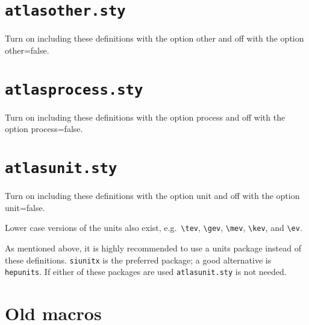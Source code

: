 \documentclass[UKenglish,texlive=2014]{latex/atlasdoc}
\newcommand{\File}[1]{\texttt{#1}\xspace}
\newcommand{\Option}[1]{\textsf{#1}\xspace}
\newcommand{\Package}[1]{\texttt{#1}\xspace}
\begin{document}
{\newpage
\section{\File{atlasother.sty}}

Turn on including these definitions with the option \Option{other} and off with the option \Option{other=false}.




\newpage
\section{\File{atlasprocess.sty}}

Turn on including these definitions with the option \Option{process} and off with the option \Option{process=false}.




\newpage
\section{\File{atlasunit.sty}}

Turn on including these definitions with the option \Option{unit} and off with the option \Option{unit=false}.



\noindent Lower case versions of the units also exist, e.g.\ \verb|\tev|, \verb|\gev|, \verb|\mev|, \verb|\kev|, and
\verb|\ev|. 

As mentioned above, it is highly recommended to use a units package instead of
these definitions. \Package{siunitx} is the preferred package; a good alternative is \Package{hepunits}.
If either of these packages are used \File{atlasunit.sty} is not needed.


\onecolumn
\section{Old macros}
\label{sec:old}

}
\end{document}
